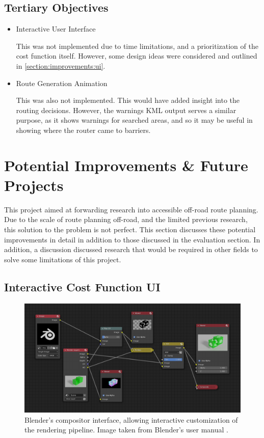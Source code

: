 \documentclass[12pt]{article}
\begin{document}
\subsection{Tertiary Objectives}

\begin{itemize}
  \item Interactive User Interface

        This was not implemented due to time limitations, and a prioritization of the cost function itself. However, some design ideas were considered and outlined in \autoref{section:improvements:ui}.

  \item Route Generation Animation

        This was also not implemented. This would have added insight into the routing decisions. However, the warnings KML output serves a similar purpose, as it shows warnings for searched areas, and so it may be useful in showing where the router came to barriers.

\end{itemize}

\section{Potential Improvements \& Future Projects}

This project aimed at forwarding research into accessible off-road route planning. Due to the scale of route planning off-road, and the limited previous research, this solution to the problem is not perfect. This section discusses these potential improvements in detail in addition to those discussed in the evaluation section. In addition, a discussion discussed research that would be required in other fields to solve some limitations of this project.

\subsection{Interactive Cost Function UI}\label{section:improvements:ui}

\begin{figure}[H]
  \centering
  \includegraphics[width=\textwidth]{assets/blender-compositor.png}
  \caption{Blender's compositor interface, allowing interactive customization of the rendering pipeline. Image taken from Blender's user manual \autocite{blenderCompositor}.}
  \label{fig:blender-compositor}
\end{figure}
\end{document}
